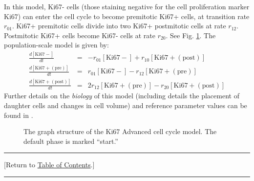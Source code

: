\documentclass[12pt]{article}
\newcommand{\beqa}{\begin{eqnarray}}
\newcommand{\eeqa}{\end{eqnarray}}
\renewcommand{\t}[1]{\left[\mathrm{#1}\right]}
\newcommand{\TOClink}{\begin{center}\hrule\vskip-5pt\phantom{.}\hfill[Return to \hyperlink{TOC}{Table of Contents}.]\hfill\phantom{.}\vskip3pt\hrule\end{center}}
\begin{document}
In this model, Ki67- cells (those staining negative for the 
cell proliferation marker Ki67) can enter the cell cycle to 
become premitotic Ki67+ cells, at transition rate $r_{01}$. Ki67+ premitotic cells 
divide into two Ki67+ postmitotic cells at rate $r_{12}$. 
Postmitotic Ki67+ cells become Ki67- cells at rate $r_{20}$. 
See Fig. \ref{fig:cycle_model:ki67_advanced}. The 
population-scale model is given by: 
\beqa
\frac{d\t{Ki67-}}{dt} & = & -r_{01} \t{Ki67-} + r_{10} \t{Ki67+ (post)} \\
\frac{d\t{Ki67+ (pre)}}{dt} & = &  r_{01} \t{Ki67-} -r_{12} \t{Ki67+ (pre)} \\
\frac{d\t{Ki67+ (post)}}{dt} & = &  2r_{12} \t{Ki67+ (pre)} -r_{20} \t{Ki67+ (post)} 
\eeqa
Further details on the \emph{biology} of this model (including 
details the placement of daughter cells and changes in cell 
volume) and reference parameter values can be found in \cite{ref:PhysiCell}. 

\begin{figure}
\begin{mdframed}[style=mystyle]
\caption{The graph structure of the Ki67 Advanced cell cycle model. The default phase is marked 
``start.''}
\label{fig:cycle_model:ki67_advanced}
\end{mdframed}
\end{figure}

\TOClink 
\end{document}
